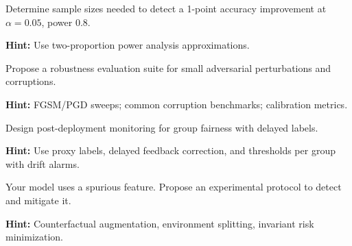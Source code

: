 \begin{problem}
Determine sample sizes needed to detect a 1-point accuracy improvement at $\alpha=0.05$, power 0.8.

\textbf{Hint:} Use two-proportion power analysis approximations.
\end{problem}

\begin{problem}
Propose a robustness evaluation suite for small adversarial perturbations and corruptions.

\textbf{Hint:} FGSM/PGD sweeps; common corruption benchmarks; calibration metrics.
\end{problem}

\begin{problem}
Design post-deployment monitoring for group fairness with delayed labels.

\textbf{Hint:} Use proxy labels, delayed feedback correction, and thresholds per group with drift alarms.
\end{problem}

\begin{problem}
Your model uses a spurious feature. Propose an experimental protocol to detect and mitigate it.

\textbf{Hint:} Counterfactual augmentation, environment splitting, invariant risk minimization.
\end{problem}


